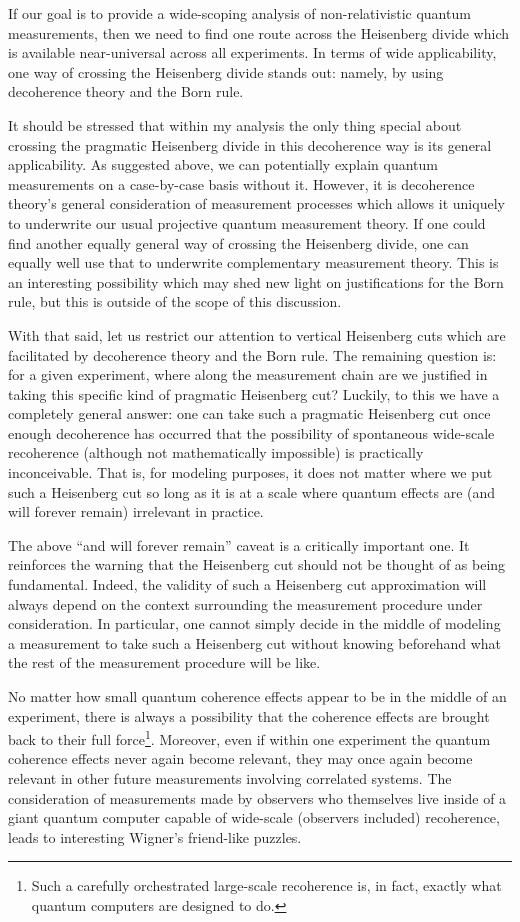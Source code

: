 \documentclass[prd,twocolumn,superscriptaddress,floatfix,amsmath,amssymb,amsfonts,nofootinbib]{revtex4-2}
\begin{document}
If our goal is to provide a wide-scoping analysis of non-relativistic quantum measurements, then we need to find one route across the Heisenberg divide which is available near-universal across all experiments. In terms of wide applicability, one way of crossing the Heisenberg divide stands out: namely, by using decoherence theory and the Born rule.

It should be stressed that within my analysis the only thing special about crossing the pragmatic Heisenberg divide in this decoherence way is its general applicability. As suggested above, we can potentially explain quantum measurements on a case-by-case basis without it. However, it is decoherence theory's general consideration of measurement processes which allows it uniquely to underwrite our usual projective quantum measurement theory. If one could find another equally general way of crossing the Heisenberg divide, one can equally well use that to underwrite complementary measurement theory. This is an interesting possibility which may shed new light on justifications for the Born rule, but this is outside of the scope of this discussion.

With that said, let us restrict our attention to vertical Heisenberg cuts which are facilitated by decoherence theory and the Born rule. The remaining question is: for a given experiment, where along the measurement chain are we justified in taking this specific kind of pragmatic Heisenberg cut? Luckily, to this we have a completely general answer: one can take such a pragmatic Heisenberg cut once enough decoherence has occurred that the possibility of spontaneous wide-scale recoherence (although not mathematically impossible) is practically inconceivable. That is, for modeling purposes, it does not matter where we put such a Heisenberg cut so long as it is at a scale where quantum effects are (and will forever remain) irrelevant in practice.

The above ``and will forever remain'' caveat is a critically important one. It reinforces the warning that the Heisenberg cut should not be thought of as being fundamental. Indeed, the validity of such a Heisenberg cut approximation will always depend on the context surrounding the measurement procedure under consideration. In particular, one cannot simply decide in the middle of modeling a measurement to take such a Heisenberg cut without knowing beforehand what the rest of the measurement procedure will be like. 

No matter how small quantum coherence effects appear to be in the middle of an experiment, there is always a possibility that the coherence effects are brought back to their full force\footnote{Such a carefully orchestrated large-scale recoherence is, in fact, exactly what quantum computers are designed to do.}. Moreover, even if within one experiment the quantum coherence effects never again become relevant, they may once again become relevant in other future measurements involving correlated systems. The consideration of measurements made by observers who themselves live inside of a giant quantum computer capable of wide-scale (observers included) recoherence, leads to interesting Wigner's friend-like puzzles.
\end{document}
